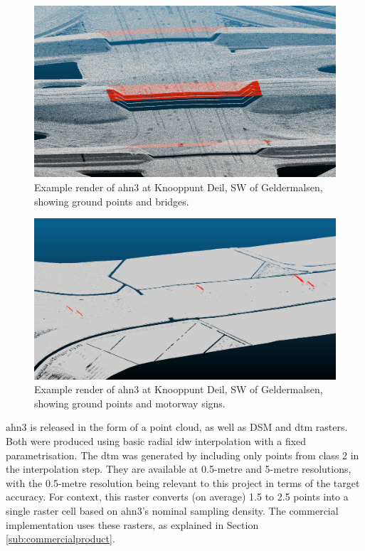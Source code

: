 \begin{figure}
    \centering
    \includegraphics[width=\linewidth]{final_report/figs/ahn_sample_01.png} 
    \caption{Example render of \ac{ahn3} at Knooppunt Deil, SW of Geldermalsen, showing ground points and bridges.}
    \label{fig:ahnbridges}
\end{figure}

\begin{figure}
    \centering
    \includegraphics[width=\linewidth]{final_report/figs/ahn_sample_02.png} 
    \caption{Example render of \ac{ahn3} at Knooppunt Deil, SW of Geldermalsen, showing ground points and motorway signs.}
    \label{fig:ahnsigns}
\end{figure}

\ac{ahn3} is released in the form of a point cloud, as well as DSM and \ac{dtm} rasters. Both were produced using basic radial \ac{idw} interpolation with a fixed parametrisation. The \ac{dtm} was generated by including only points from class 2 in the interpolation step. They are available at 0.5-metre and 5-metre resolutions, with the 0.5-metre resolution being relevant to this project in terms of the target accuracy. For context, this raster converts (on average) 1.5 to 2.5 points into a single raster cell based on \ac{ahn3}'s nominal sampling density. The commercial implementation uses these rasters, as explained in Section \ref{sub:commercialproduct}.

